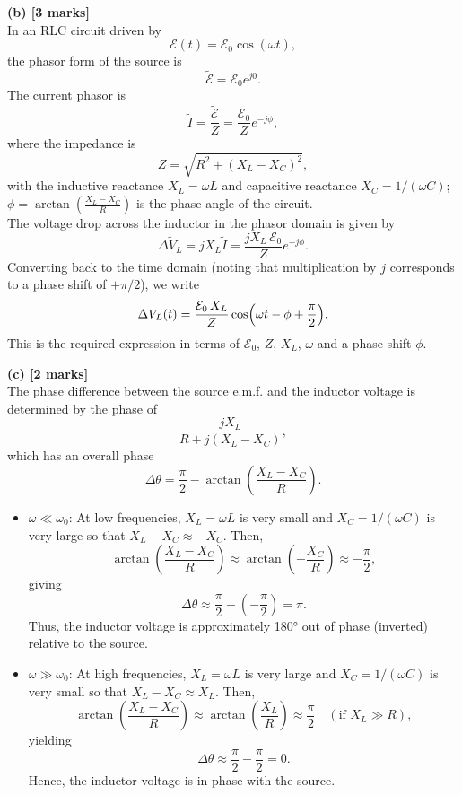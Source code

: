 \documentclass{article}
\begin{document}
\bigskip
\textbf{(b) [3 marks]}\\
In an RLC circuit driven by 
\[
\mathcal{E}(t)=\mathcal{E}_0\cos(\omega t),
\]
the phasor form of the source is 
\[
\tilde{\mathcal{E}}=\mathcal{E}_0 e^{j0}.
\]
The current phasor is 
\[
\tilde{I}=\frac{\tilde{\mathcal{E}}}{Z}=\frac{\mathcal{E}_0}{Z}e^{-j\phi},
\]
where the impedance is 
\[
Z=\sqrt{R^2+(X_L-X_C)^2},
\]
with the inductive reactance \(X_L=\omega L\) and capacitive reactance \(X_C=1/(\omega C)\); \(\phi=\arctan\left(\frac{X_L-X_C}{R}\right)\) is the phase angle of the circuit.\\[1mm]
The voltage drop across the inductor in the phasor domain is given by
\[
\Delta \tilde{V}_L=jX_L\tilde{I}=\frac{jX_L\,\mathcal{E}_0}{Z}e^{-j\phi}.
\]
Converting back to the time domain (noting that multiplication by \(j\) corresponds to a phase shift of \(+\pi/2\)), we write
\[
\Delta V_L(t)=\frac{\mathcal{E}_0\,X_L}{Z}\cos\Bigl(\omega t-\phi+\frac{\pi}{2}\Bigr).
\]
This is the required expression in terms of \(\mathcal{E}_0\), \(Z\), \(X_L\), \(\omega\) and a phase shift \(\phi\).

\bigskip
\textbf{(c) [2 marks]}\\
The phase difference between the source e.m.f. and the inductor voltage is determined by the phase of
\[
\frac{jX_L}{R+j(X_L-X_C)},
\]
which has an overall phase
\[
\Delta\theta=\frac{\pi}{2}-\arctan\left(\frac{X_L-X_C}{R}\right).
\]
\begin{itemize}
    \item \(\omega\ll\omega_0\): At low frequencies, \(X_L=\omega L\) is very small and \(X_C=1/(\omega C)\) is very large so that \(X_L-X_C\approx -X_C\). Then,
    \[
    \arctan\left(\frac{X_L-X_C}{R}\right)\approx\arctan\left(-\frac{X_C}{R}\right)\approx -\frac{\pi}{2},
    \]
    giving
    \[
    \Delta\theta\approx\frac{\pi}{2}-\left(-\frac{\pi}{2}\right)=\pi.
    \]
    Thus, the inductor voltage is approximately 180° out of phase (inverted) relative to the source.
    
    \item \(\omega\gg\omega_0\): At high frequencies, \(X_L=\omega L\) is very large and \(X_C=1/(\omega C)\) is very small so that \(X_L-X_C\approx X_L\). Then,
    \[
    \arctan\left(\frac{X_L-X_C}{R}\right)\approx\arctan\left(\frac{X_L}{R}\right)\approx\frac{\pi}{2}\quad (\text{if }X_L\gg R),
    \]
    yielding
    \[
    \Delta\theta\approx\frac{\pi}{2}-\frac{\pi}{2}=0.
    \]
    Hence, the inductor voltage is in phase with the source.
\end{itemize}
\end{document}
